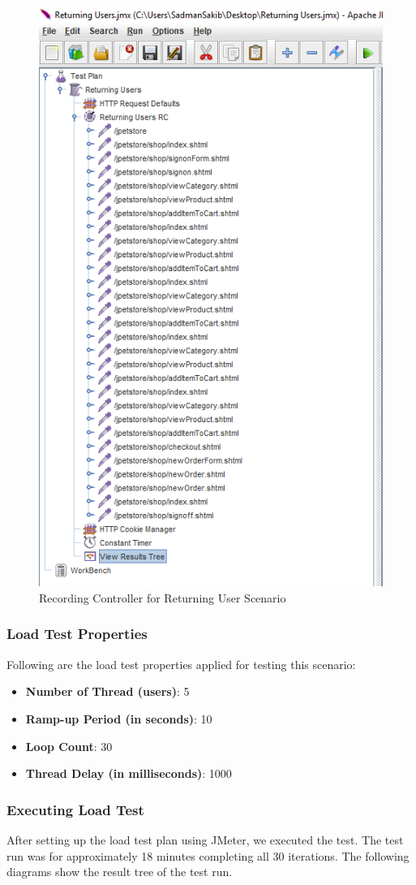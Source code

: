 \documentclass[fontsize=12pt,paper=letter,twoside]{scrartcl}
\begin{document}
\begin{figure}[!htb]
\begin{center}
\includegraphics[width=.6\textwidth]{../../load-test/test-plans/returning-user/rc.png}
\end{center}
\caption{Recording Controller for Returning User Scenario}
\label{fig:ruser:rc}
\end{figure}

\clearpage
\subsubsection{Load Test Properties}
Following are the load test properties applied for testing this scenario:
\begin{itemize}
\item \textbf{Number of Thread (users)}: 5
\item \textbf{Ramp-up Period (in seconds)}: 10
\item \textbf{Loop Count}: 30
\item \textbf{Thread Delay (in milliseconds)}: 1000
\end{itemize}

\subsubsection{Executing Load Test}
After setting up the load test plan using JMeter, we executed the test. The test run was for approximately 18 minutes completing all 30 iterations. The following diagrams show the result tree of the test run.
\end{document}
